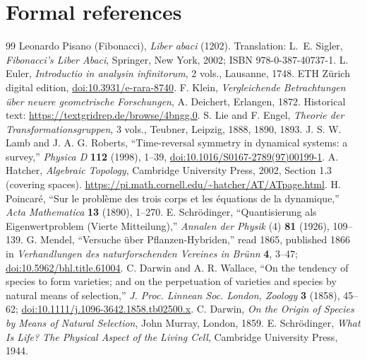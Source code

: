 \documentclass[10pt,letterpaper]{article}
\theoremstyle{definition}\newtheorem{definition}[theorem]{Definition}
\begin{document}
\section{Formal references}
\begingroup\footnotesize
\begin{thebibliography}{99}\setlength{\itemsep}{3pt}
 Leonardo Pisano (Fibonacci), \emph{Liber abaci} (1202). Translation: L.~E. Sigler, \emph{Fibonacci's Liber Abaci}, Springer, New York, 2002; ISBN 978-0-387-40737-1.
 L. Euler, \emph{Introductio in analysin infinitorum}, 2 vols., Lausanne, 1748. ETH Z\"urich digital edition, \href{https://doi.org/10.3931/e-rara-8740}{doi:10.3931/e-rara-8740}.
 F. Klein, \emph{Vergleichende Betrachtungen \"uber neuere geometrische Forschungen}, A. Deichert, Erlangen, 1872. Historical text: \url{https://textgridrep.de/browse/4bngg.0}.
 S. Lie and F. Engel, \emph{Theorie der Transformationsgruppen}, 3 vols., Teubner, Leipzig, 1888, 1890, 1893.
 J. S. W. Lamb and J. A. G. Roberts, ``Time-reversal symmetry in dynamical systems: a survey,'' \emph{Physica D} \textbf{112} (1998), 1--39, \href{https://doi.org/10.1016/S0167-2789(97)00199-1}{doi:10.1016/S0167-2789(97)00199-1}.
 A. Hatcher, \emph{Algebraic Topology}, Cambridge University Press, 2002, Section 1.3 (covering spaces). \url{https://pi.math.cornell.edu/~hatcher/AT/ATpage.html}.
 H. Poincar\'e, ``Sur le probl\`eme des trois corps et les \'equations de la dynamique,'' \emph{Acta Mathematica} \textbf{13} (1890), 1--270.
 E. Schr\"odinger, ``Quantisierung als Eigenwertproblem (Vierte Mitteilung),'' \emph{Annalen der Physik} (4) \textbf{81} (1926), 109--139.
 G. Mendel, ``Versuche \"uber Pflanzen-Hybriden,'' read 1865, published 1866 in \emph{Verhandlungen des naturforschenden Vereines in Br\"unn} \textbf{4}, 3--47; \href{https://doi.org/10.5962/bhl.title.61004}{doi:10.5962/bhl.title.61004}.
 C. Darwin and A. R. Wallace, ``On the tendency of species to form varieties; and on the perpetuation of varieties and species by natural means of selection,'' \emph{J. Proc. Linnean Soc. London, Zoology} \textbf{3} (1858), 45--62; \href{https://doi.org/10.1111/j.1096-3642.1858.tb02500.x}{doi:10.1111/j.1096-3642.1858.tb02500.x}.
 C. Darwin, \emph{On the Origin of Species by Means of Natural Selection}, John Murray, London, 1859.
 E. Schr\"odinger, \emph{What Is Life? The Physical Aspect of the Living Cell}, Cambridge University Press, 1944.

\end{thebibliography}
\end{document}
